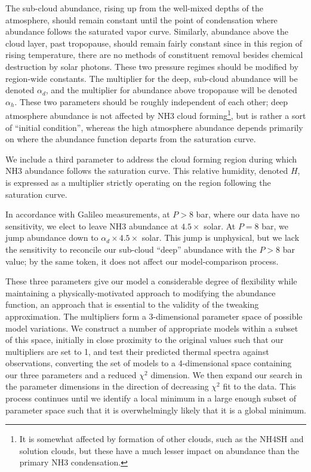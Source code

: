 \documentclass{article}
\begin{document}
	The sub-cloud abundance, rising up from the well-mixed depths of the atmosphere, should remain constant until the point of condensation where abundance follows the saturated vapor curve.
	Similarly, abundance above the cloud layer, past tropopause, should remain fairly constant since in this region of rising temperature, there are no methods of constituent removal besides chemical destruction by solar photons.
	These two pressure regimes should be modified by region-wide constants.
	The multiplier for the deep, sub-cloud abundance will be denoted $\alpha_{d}$, and the multiplier for abundance above tropopause will be denoted $\alpha_{h}$.
	These two parameters should be roughly independent of each other; deep atmosphere abundance is not affected by NH3 cloud forming\footnote{It is somewhat affected by formation of other clouds, such as the NH4SH and solution clouds, but these have a much lesser impact on abundance than the primary NH3 condensation.}, but is rather a sort of ``initial condition'', whereas the high atmosphere abundance depends primarily on where the abundance function departs from the saturation curve.

	We include a third parameter to address the cloud forming region during which NH3 abundance follows the saturation curve.
	This relative humidity, denoted $H$, is expressed as a multiplier strictly operating on the region following the saturation curve.

	In accordance with Galileo measurements, at $P > 8$ bar, where our data have no sensitivity, we elect to leave NH3 abundance at $4.5 \times$ solar.
	At $P = 8$ bar, we jump abundance down to $\alpha_{d} \times 4.5 \times$ solar.
	This jump is unphysical, but we lack the sensitivity to reconcile our sub-cloud ``deep'' abundance with the $P > 8$ bar value;
	by the same token, it does not affect our model-comparison process.

	These three parameters give our model a considerable degree of flexibility while maintaining a physically-motivated approach to modifying the abundance function, an approach that is essential to the validity of the tweaking approximation.
	The multipliers form a 3-dimensional parameter space of possible model variations.
	We construct a number of appropriate models within a subset of this space, initially in close proximity to the original values such that our multipliers are set to 1, and test their predicted thermal spectra against observations, converting the set of models to a 4-dimensional space containing our three parameters and a reduced $\chi^{2}$ dimension.
	We then expand our search in the parameter dimensions in the direction of decreasing $\chi^{2}$ fit to the data.
	This process continues until we identify a local minimum in a large enough subset of parameter space such that it is overwhelmingly likely that it is a global minimum.
\end{document}
